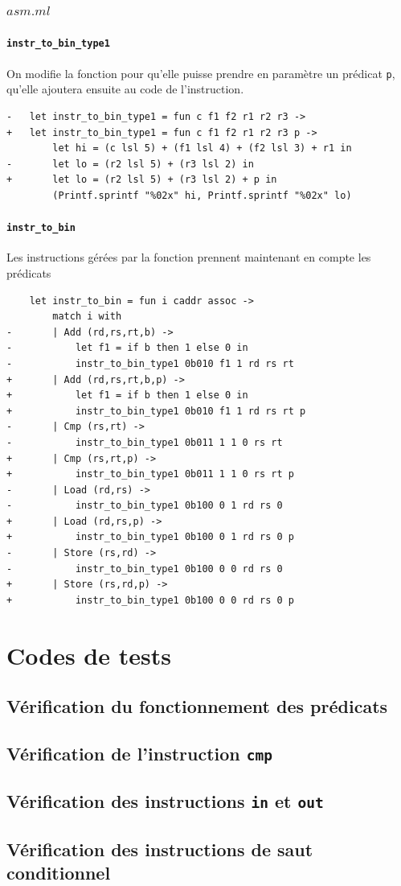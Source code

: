 \documentclass[11pt, a4paper, twoside, titlepage]{article}
\begin{document}
\subsubsection{$asm.ml$}
\paragraph{\texttt{instr\_to\_bin\_type1}}
On modifie la fonction pour qu'elle puisse prendre en paramètre un prédicat \texttt{p}, qu'elle ajoutera ensuite au code de l'instruction.
\begin{lstlisting}
-	let instr_to_bin_type1 = fun c f1 f2 r1 r2 r3 ->
+	let instr_to_bin_type1 = fun c f1 f2 r1 r2 r3 p ->
		let hi = (c lsl 5) + (f1 lsl 4) + (f2 lsl 3) + r1 in
-		let lo = (r2 lsl 5) + (r3 lsl 2) in
+		let lo = (r2 lsl 5) + (r3 lsl 2) + p in
		(Printf.sprintf "%02x" hi, Printf.sprintf "%02x" lo)
\end{lstlisting}
\paragraph{\texttt{instr\_to\_bin}}
Les instructions gérées par la fonction prennent maintenant en compte les prédicats
\begin{lstlisting}
	let instr_to_bin = fun i caddr assoc ->
		match i with
-		| Add (rd,rs,rt,b) ->
-			let f1 = if b then 1 else 0 in
-			instr_to_bin_type1 0b010 f1 1 rd rs rt
+		| Add (rd,rs,rt,b,p) ->
+			let f1 = if b then 1 else 0 in
+			instr_to_bin_type1 0b010 f1 1 rd rs rt p
-		| Cmp (rs,rt) ->
-			instr_to_bin_type1 0b011 1 1 0 rs rt
+		| Cmp (rs,rt,p) ->
+			instr_to_bin_type1 0b011 1 1 0 rs rt p
-		| Load (rd,rs) ->
-			instr_to_bin_type1 0b100 0 1 rd rs 0
+		| Load (rd,rs,p) ->
+			instr_to_bin_type1 0b100 0 1 rd rs 0 p
-		| Store (rs,rd) ->
-			instr_to_bin_type1 0b100 0 0 rd rs 0
+		| Store (rs,rd,p) ->
+			instr_to_bin_type1 0b100 0 0 rd rs 0 p
\end{lstlisting}

\section{Codes de tests}

\subsection{Vérification du fonctionnement des prédicats}


\subsection{Vérification de l'instruction \texttt{cmp}}


\subsection{Vérification des instructions \texttt{in} et \texttt{out}}


\subsection{Vérification des instructions de saut conditionnel}

\end{document}
